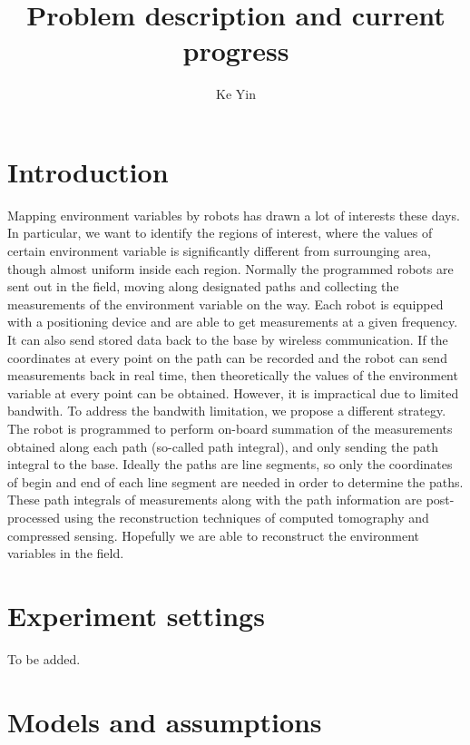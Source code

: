 \documentclass[english]{article}\usepackage[]{graphicx}\usepackage[]{color}
\begin{document}
\title{Problem description and current progress}


\author{Ke Yin}

\maketitle

\section{Introduction}

Mapping environment variables by robots has drawn a lot of interests
these days. In particular, we want to identify the regions of interest,
where the values of certain environment variable is significantly
different from surrounging area, though almost uniform inside each
region. Normally the programmed robots are sent out in the field,
moving along designated paths and collecting the measurements of the
environment variable on the way. Each robot is equipped with a positioning
device and are able to get measurements at a given frequency. It can
also send stored data back to the base by wireless communication.
If the coordinates at every point on the path can be recorded and
the robot can send measurements back in real time, then theoretically
the values of the environment variable at every point can be obtained.
However, it is impractical due to limited bandwith. To address the
bandwith limitation, we propose a different strategy. The robot is
programmed to perform on-board summation of the measurements obtained
along each path (so-called path integral), and only sending the path
integral to the base. Ideally the paths are line segments, so only
the coordinates of begin and end of each line segment are needed in
order to determine the paths. These path integrals of measurements
along with the path information are post-processed using the reconstruction
techniques of computed tomography and compressed sensing. Hopefully
we are able to reconstruct the environment variables in the field.


\section{Experiment settings}

To be added.


\section{Models and assumptions}
\end{document}
